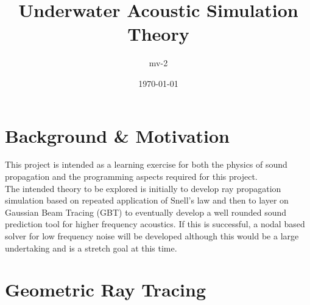 \documentclass{article}
\title{Underwater Acoustic Simulation Theory}
\author{mv-2}
\date{\today}
\begin{document}
\maketitle
\tableofcontents
\clearpage

\section{Background \& Motivation}
This project is intended as a learning exercise for both the physics of sound propagation and the programming aspects required for this project. \\
The intended theory to be explored is initially to develop ray propagation simulation based on repeated application of Snell's law and then to layer on Gaussian Beam Tracing (GBT) to eventually develop a well rounded sound prediction tool for higher frequency acoustics. If this is successful, a nodal based solver for low frequency noise will be developed although this would be a large undertaking and is a stretch goal at this time.

\section{Geometric Ray Tracing}
\end{document}
